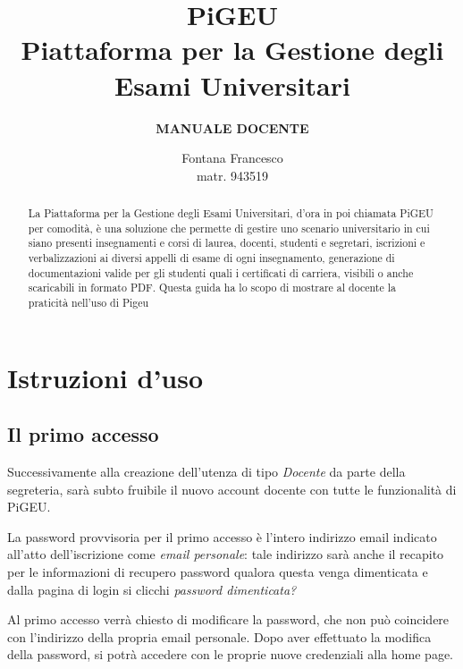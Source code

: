 \documentclass{article}
\title{PiGEU\\ Piattaforma per la Gestione degli Esami Universitari}
\author{\textbf{MANUALE DOCENTE}}
\date{Fontana Francesco \\ matr. 943519}
\begin{document}
    \maketitle

    \begin{abstract}

        La Piattaforma per la Gestione degli Esami Universitari, d'ora in poi chiamata PiGEU per comodità, è una soluzione che permette di gestire
        uno scenario universitario in cui siano presenti insegnamenti e corsi di laurea, docenti, studenti e segretari, iscrizioni e verbalizzazioni
        ai diversi appelli di esame di ogni insegnamento, generazione di documentazioni valide per gli studenti quali i certificati di carriera, visibili
        o anche scaricabili in formato PDF.
        Questa guida ha lo scopo di mostrare al docente la praticità nell'uso di Pigeu
    \end{abstract}

    \pagebreak

    \tableofcontents

    \pagebreak

    \section{Istruzioni d'uso}
    \subsection{Il primo accesso}
    Successivamente alla creazione dell'utenza di tipo \textit{Docente} da parte della segreteria, sarà subto fruibile il nuovo account docente con tutte le funzionalità di PiGEU.

    La password provvisoria per il primo accesso è l'intero indirizzo email indicato all'atto dell'iscrizione come \textit{email personale}: tale indirizzo sarà anche il recapito per le informazioni di recupero password qualora questa venga dimenticata e dalla pagina di login si clicchi \textit{password dimenticata?}

    Al primo accesso verrà chiesto di modificare la password, che non può coincidere con l'indirizzo della propria email personale. Dopo aver effettuato la modifica della password, si potrà accedere con le proprie nuove credenziali alla home page.
\end{document}
